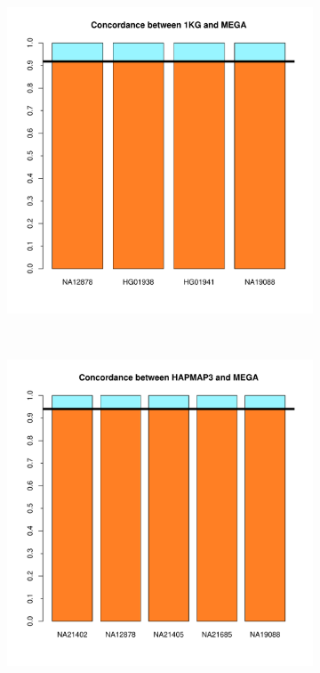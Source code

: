 \documentclass[11pt]{report}
\begin{document}
\begin{figure}[ht!]
    \centering
    \caption{Comparacion cluster PAGE}
    \begin{subfigure}[t]{0.5\textwidth}
        \centering
        \includegraphics[scale=0.55]{Concordance_1KG_MEGA_clusterPAGE.pdf}
    \end{subfigure}%
    ~ 
    \begin{subfigure}[t]{0.5\textwidth}
        \centering
        \includegraphics[scale=0.55]{Concordance_HAPMAP_MEGA_clusterPAGE.pdf}
    \end{subfigure}
\end{figure}
\end{document}

